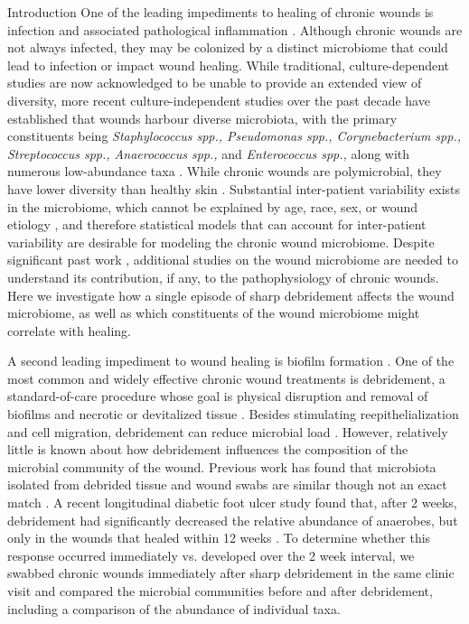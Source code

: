 \documentclass[oneside,12pt,final]{sty/ucthesis-CA2012}
\begin{document}
\begin{mainmatter}
\begin{section}{Introduction}
One of the leading impediments to healing of chronic wounds is infection and associated pathological inflammation \cite{RN5}. Although chronic wounds are not always infected, they may be colonized by a distinct microbiome that could lead to infection or impact wound healing. While traditional, culture-dependent studies are now acknowledged to be unable to provide an extended view of diversity, more recent culture-independent studies over the past decade have established that wounds harbour diverse microbiota, with the primary constituents being \textit{Staphylococcus spp., Pseudomonas spp., Corynebacterium spp., Streptococcus spp., Anaerococcus spp.,} and \textit{Enterococcus spp.,} along with numerous low-abundance taxa \cite{RN6, RN7, RN8}. While chronic wounds are polymicrobial, they have lower diversity than healthy skin \cite{RN9}. Substantial inter-patient variability exists in the microbiome, which cannot be explained by age, race, sex, or wound etiology \cite{RN6, RN10}, and therefore statistical models that can account for inter-patient variability are desirable for modeling the chronic wound microbiome. Despite significant past work \cite{RN6, RN7, RN8, RN9, RN10, RN11, RN12, RN13, RN14, RN15, RN16, RN17, RN18, RN19, RN20, RN21, RN22, RN23, RN24, RN25, RN26, RN27, RN28}, additional studies on the wound microbiome are needed to understand its contribution, if any, to the pathophysiology of chronic wounds. Here we investigate how a single episode of sharp debridement affects the wound microbiome, as well as which constituents of the wound microbiome might correlate with healing.

A second leading impediment to wound healing is biofilm formation \cite{RN5, RN29}. One of the most common and widely effective chronic wound treatments is debridement, a standard-of-care procedure whose goal is physical disruption and removal of biofilms and necrotic or devitalized tissue \cite{RN30, RN31}. Besides stimulating reepithelialization and cell migration, debridement can reduce microbial load \cite{RN30, RN31}. However, relatively little is known about how debridement influences the composition of the microbial community of the wound. Previous work has found that microbiota isolated from debrided tissue and wound swabs are similar though not an exact match \cite{RN9}. A recent longitudinal diabetic foot ulcer study found that, after 2 weeks, debridement had significantly decreased the relative abundance of anaerobes, but only in the wounds that healed within 12 weeks \cite{RN8}. To determine whether this response occurred immediately vs. developed over the 2 week interval, we swabbed chronic wounds immediately after sharp debridement in the same clinic visit and compared the microbial communities before and after debridement, including a comparison of the abundance of individual taxa. 


\end{section}
\end{mainmatter}
\end{document}
